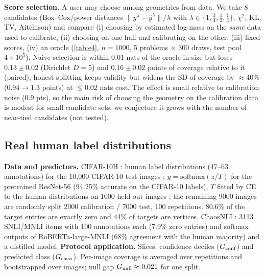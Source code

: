 \documentclass{article}
\theoremstyle{plain}
\theoremstyle{remark}
\newcommand{\yh}{\hat y}
\begin{document}
\begin{table}[t]
\caption{Learned MLP predictor ($n_{\rm train}=3000$), Dirichlet noise, $D{=}5$, $\kappa{=}100$; $G_{s(x)}$: worst gap over deciles of the true noise scale, $G_{\rm conf}$: over confidence deciles; $\Delta$ log mass relative to plain split of the same score (paired over problems, $\pm$ 95\% $t$ interval). Other families: App.\ \cref{tab:e3full}.}\label{tab:e3}
\centering\scriptsize
\resizebox{\columnwidth}{!}{}
\end{table}

\textbf{Score selection.} A user may choose among geometries from data. We take 8 candidates (Box--Cox/power distances $\|y^\lambda-\yh^\lambda\|/\lambda$ with $\lambda\in\{1,\tfrac34,\tfrac12,\tfrac14\}$, $\chi^2$, KL, TV, Aitchison) and compare (i) choosing by estimated log-mass on the \emph{same} data used to calibrate, (ii) choosing on one half and calibrating on the other, (iii) fixed scores, (iv) an oracle (\cref{tab:e4}, $n=1000$, 5 problems $\times$ 300 draws, test pool $4\times10^5$). Naive selection is within $0.01$ nats of the oracle in size but loses $0.13\pm0.02$ (Dirichlet $D{=}5$) and $0.16\pm0.02$ points of coverage relative to it (paired); honest splitting keeps validity but widens the SD of coverage by $\approx40\%$ ($0.94\to1.3$ points) at $\le0.02$ nats cost. The effect is small relative to calibration noise ($0.9$ pts), so the main risk of choosing the geometry on the calibration data is modest for small candidate sets; we conjecture it grows with the number of near-tied candidates (not tested).

\subsection{Real human label distributions}\label{sec:real}
\textbf{Data and predictors.} CIFAR-10H \citep{peterson2019}: human label distributions (47--63 annotations) for the 10{,}000 CIFAR-10 test images \citep{krizhevsky2009}; $\yh=\mathrm{softmax}(z/T)$ for the pretrained ResNet-56 \citep{chenyaofo} (94.25\% accurate on the CIFAR-10 labels), $T$ fitted by CE to the human distributions on 1000 held-out images \citep{guo2017}; the remaining 9000 images are randomly split 2000 calibration / 7000 test, 100 repetitions. 80.6\% of the target entries are exactly zero and 44\% of targets are vertices. ChaosNLI \citep{nie2020}: 3113 SNLI/MNLI items with 100 annotations each (7.9\% zero entries) and softmax outputs of RoBERTa-large-MNLI (68\% agreement with the human majority) and a distilled model.
\textbf{Protocol application.} Slices: confidence deciles ($G_{\rm conf}$) and predicted class ($G_{\rm class}$). Per-image coverage is averaged over repetitions and bootstrapped over images; null gap $G_{\rm null}\approx0.021$ for one split.
\end{document}
